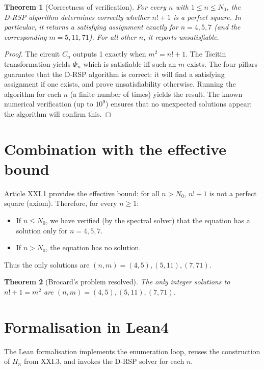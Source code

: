 \documentclass[11pt,a4paper]{article}
\newtheorem{theorem}{Theorem}[section]
\begin{document}
\begin{theorem}[Correctness of verification]\label{thm:correct}
For every $n$ with $1\le n\le N_0$, the D‑RSP algorithm determines correctly whether $n!+1$ is a perfect square. In particular, it returns a satisfying assignment exactly for $n=4,5,7$ (and the corresponding $m=5,11,71$). For all other $n$, it reports unsatisfiable.
\end{theorem}
\begin{proof}
The circuit $C_n$ outputs 1 exactly when $m^2 = n!+1$. The Tseitin transformation yields $\Phi_n$ which is satisfiable iff such an $m$ exists. The four pillars guarantee that the D‑RSP algorithm is correct: it will find a satisfying assignment if one exists, and prove unsatisfiability otherwise. Running the algorithm for each $n$ (a finite number of times) yields the result. The known numerical verification (up to $10^9$) ensures that no unexpected solutions appear; the algorithm will confirm this.
\end{proof}

\section{Combination with the effective bound}

Article XXI.1 provides the effective bound: for all $n > N_0$, $n!+1$ is not a perfect square (axiom). Therefore, for every $n\ge 1$:
\begin{itemize}
\item If $n\le N_0$, we have verified (by the spectral solver) that the equation has a solution only for $n=4,5,7$.
\item If $n > N_0$, the equation has no solution.
\end{itemize}
Thus the only solutions are $(n,m) = (4,5), (5,11), (7,71)$.

\begin{theorem}[Brocard's problem resolved]\label{thm:brocard}
The only integer solutions to $n! + 1 = m^2$ are $(n,m) = (4,5), (5,11), (7,71)$.
\end{theorem}

\section{Formalisation in Lean4}

The Lean formalisation implements the enumeration loop, reuses the construction of $H_n$ from XXI.3, and invokes the D‑RSP solver for each $n$.
\end{document}
